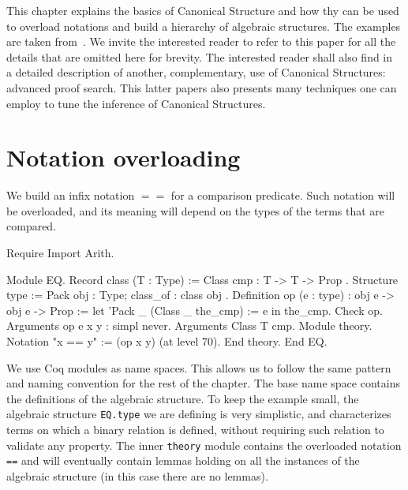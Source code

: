 
\label{CS-full}

This chapter explains the basics of Canonical Structure and how thy can be used
to overload notations and build a hierarchy of algebraic structures.
The examples are taken from~\cite{CSwcu}.  We invite the interested reader
to refer to this paper for all the details that are omitted here for brevity.
The interested reader shall also find in~\cite{CSlessadhoc} a detailed
description of another, complementary, use of Canonical Structures:
advanced proof search.  This latter papers also presents many techniques one
can employ to tune the inference of Canonical Structures.

\section{Notation overloading}

We build an infix notation $==$ for a comparison predicate.  Such notation
will be overloaded, and its meaning will depend on the types of the terms
that are compared.

\begin{coq_eval}
Require Import Arith.
\end{coq_eval}

\begin{coq_example}
Module EQ.
  Record class (T : Type) := Class { cmp : T -> T -> Prop }.
  Structure type := Pack { obj : Type; class_of : class obj }.
  Definition op (e : type) : obj e -> obj e -> Prop :=
    let 'Pack _ (Class _ the_cmp) := e in the_cmp.
  Check op.
  Arguments op {e} x y : simpl never.
  Arguments Class {T} cmp.
  Module theory.
    Notation "x == y" := (op x y) (at level 70).
  End theory.
End EQ.
\end{coq_example}

We use Coq modules as name spaces.  This allows us to follow the same pattern
and naming convention for the rest of the chapter.  The base name space
contains the definitions of the algebraic structure.  To keep the example
small, the algebraic structure \texttt{EQ.type} we are defining is very simplistic,
and characterizes terms on which a binary relation is defined, without
requiring such relation to validate any property.
The inner \texttt{theory} module contains the overloaded notation \texttt{==} and
will eventually contain lemmas holding on all the instances of the
algebraic structure (in this case there are no lemmas).

